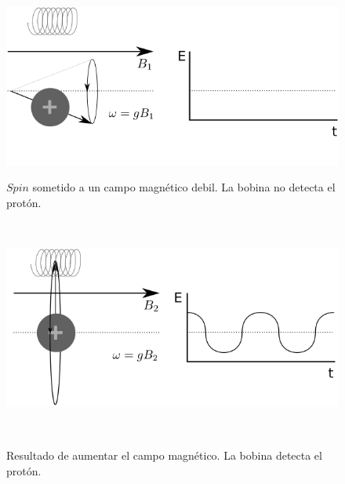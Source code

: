 \begin{figure}[h!]

\begin{minipage}[b]{0.49\textwidth}
    \includegraphics[width=\textwidth]{1.background/dmri/img/spin0.png}
    \caption{$Spin$ sometido a un campo magn\'etico debil. La bobina no
             detecta el prot\'on.}
    \label{fig:nosignal}
\end{minipage} ~ %
\hfill
\begin{minipage}[b]{0.49\textwidth}
    \includegraphics[width=\textwidth]{1.background/dmri/img/spin1.png}
    \caption{Resultado de aumentar el campo magn\'etico. La bobina 
             detecta el prot\'on.}
    \label{fig:signal}    
\end{minipage} ~ %

\end{figure}

